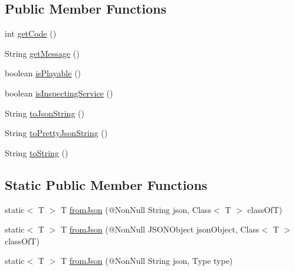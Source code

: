 \subsection*{Public Member Functions}
\begin{DoxyCompactItemize}
\item 
int \hyperlink{classcom_1_1toast_1_1android_1_1gamebase_1_1launching_1_1data_1_1_launching_status_a8361b009dd85dd991e5e684d648ffabf}{get\+Code} ()
\item 
String \hyperlink{classcom_1_1toast_1_1android_1_1gamebase_1_1launching_1_1data_1_1_launching_status_afafd068b736520af1e24269a284980a9}{get\+Message} ()
\item 
boolean \hyperlink{classcom_1_1toast_1_1android_1_1gamebase_1_1launching_1_1data_1_1_launching_status_a4e7246a0ecb5d31951a58d042ad07cb7}{is\+Playable} ()
\item 
boolean \hyperlink{classcom_1_1toast_1_1android_1_1gamebase_1_1launching_1_1data_1_1_launching_status_a4504b00719249ab86e92261b61e6ef75}{is\+Inspecting\+Service} ()
\item 
String \hyperlink{classcom_1_1toast_1_1android_1_1gamebase_1_1base_1_1_value_object_a58acf6402880e9769d79d8667581fa6a}{to\+Json\+String} ()
\item 
String \hyperlink{classcom_1_1toast_1_1android_1_1gamebase_1_1base_1_1_value_object_a054431f3d988a22295cfc8b784ff2637}{to\+Pretty\+Json\+String} ()
\item 
String \hyperlink{classcom_1_1toast_1_1android_1_1gamebase_1_1base_1_1_value_object_ad146fa8579a5f8a876c4688cc5a68520}{to\+String} ()
\end{DoxyCompactItemize}
\subsection*{Static Public Member Functions}
\begin{DoxyCompactItemize}
\item 
static$<$ T $>$ T \hyperlink{classcom_1_1toast_1_1android_1_1gamebase_1_1base_1_1_value_object_ae6655c88c20a9a8406dc11b46250ac7b}{from\+Json} (@Non\+Null String json, Class$<$ T $>$ class\+OfT)
\item 
static$<$ T $>$ T \hyperlink{classcom_1_1toast_1_1android_1_1gamebase_1_1base_1_1_value_object_ab83c4196ee2e3f11553bbe0f04dc2101}{from\+Json} (@Non\+Null J\+S\+O\+N\+Object json\+Object, Class$<$ T $>$ class\+OfT)
\item 
static$<$ T $>$ T \hyperlink{classcom_1_1toast_1_1android_1_1gamebase_1_1base_1_1_value_object_aa901d97d495150b54bcb80c05672f58a}{from\+Json} (@Non\+Null String json, Type type)
\end{DoxyCompactItemize}
